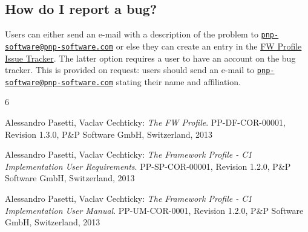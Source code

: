 \documentclass[faq]{../fwprofile}
\begin{document}
\subsection{How do I report a bug?}
Users can either send an e-mail with a description of the problem to \href{mailto:pnp-software@pnp-software.com}{\nolinkurl{pnp-software@pnp-software.com}} 
or else they can create an entry in the \href{http://www.pnp-software.com/mantisbt-1.2.5/login_page.php}{FW Profile Issue Tracker}. 
The latter option requires a user to have an account on the bug tracker. This is provided on request: users should send an e-mail to 
\href{mailto:pnp-software@pnp-software.com}{\nolinkurl{pnp-software@pnp-software.com}} stating their name and affiliation. 

\newpage

\begin{thebibliography}{6}

 Alessandro Pasetti, Vaclav Cechticky:
           {\sl The FW Profile}. PP-DF-COR-00001, Revision 1.3.0,
           P\&P Software GmbH, Switzerland, 2013

 Alessandro Pasetti, Vaclav Cechticky:
           {\sl The Framework Profile - C1 Implementation User Requirements}. PP-SP-COR-00001, Revision 1.2.0,
           P\&P Software GmbH, Switzerland, 2013

 Alessandro Pasetti, Vaclav Cechticky:
            {\sl The Framework Profile - C1 Implementation User Manual}. PP-UM-COR-0001, Revision 1.2.0,
            P\&P Software GmbH, Switzerland, 2013   


\end{thebibliography}
\end{document}
